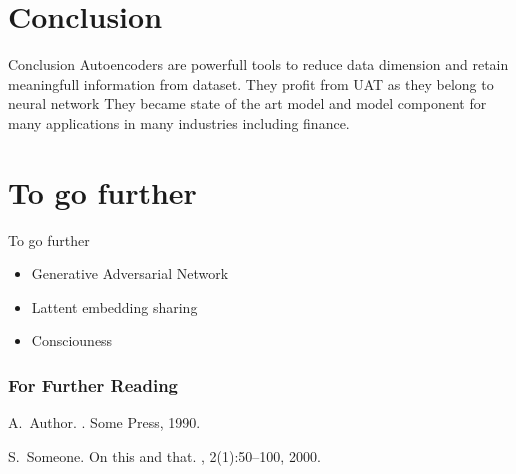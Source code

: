 \documentclass{beamer}
\begin{document}
\section{Conclusion}
\begin{frame}{Conclusion}
    Autoencoders are powerfull tools to reduce data dimension and retain meaningfull information from dataset.
    They profit from UAT as they belong to neural network
    They became state of the art model and model component for many applications in many industries including finance.
\end{frame}

\section{To go further}
\begin{frame}{To go further}
\begin{itemize}
        \item Generative Adversarial Network
        \item Lattent embedding sharing
        \item Consciouness
\end{itemize}
\end{frame}




\begin{frame}[allowframebreaks]
  \frametitle<presentation>{For Further Reading}
    
  \begin{thebibliography}{10}
    
  \beamertemplatebookbibitems

    A.~Author.
    .
    \newblock Some Press, 1990.
 
    
  \beamertemplatearticlebibitems

    S.~Someone.
    \newblock On this and that.
    , 2(1):50--100,
    2000.
  \end{thebibliography}
\end{frame}
\end{document}
